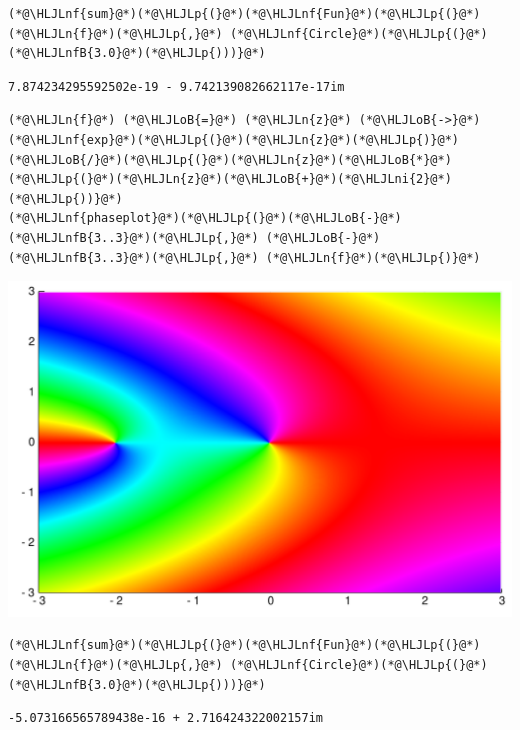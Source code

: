 \documentclass[12pt,a4paper]{article}
\newcommand{\HLJLn}[1]{#1}
\newcommand{\HLJLnf}[1]{\textcolor[RGB]{66,102,213}{#1}}
\newcommand{\HLJLnfB}[1]{\textcolor[RGB]{59,151,46}{#1}}
\newcommand{\HLJLni}[1]{\textcolor[RGB]{59,151,46}{#1}}
\newcommand{\HLJLoB}[1]{\textcolor[RGB]{102,102,102}{\textbf{#1}}}
\newcommand{\HLJLp}[1]{#1}
\begin{document}
\begin{lstlisting}
(*@\HLJLnf{sum}@*)(*@\HLJLp{(}@*)(*@\HLJLnf{Fun}@*)(*@\HLJLp{(}@*)(*@\HLJLn{f}@*)(*@\HLJLp{,}@*) (*@\HLJLnf{Circle}@*)(*@\HLJLp{(}@*)(*@\HLJLnfB{3.0}@*)(*@\HLJLp{)))}@*)
\end{lstlisting}

\begin{lstlisting}
7.874234295592502e-19 - 9.742139082662117e-17im
\end{lstlisting}


\begin{lstlisting}
(*@\HLJLn{f}@*) (*@\HLJLoB{=}@*) (*@\HLJLn{z}@*) (*@\HLJLoB{->}@*) (*@\HLJLnf{exp}@*)(*@\HLJLp{(}@*)(*@\HLJLn{z}@*)(*@\HLJLp{)}@*)(*@\HLJLoB{/}@*)(*@\HLJLp{(}@*)(*@\HLJLn{z}@*)(*@\HLJLoB{*}@*)(*@\HLJLp{(}@*)(*@\HLJLn{z}@*)(*@\HLJLoB{+}@*)(*@\HLJLni{2}@*)(*@\HLJLp{))}@*)
(*@\HLJLnf{phaseplot}@*)(*@\HLJLp{(}@*)(*@\HLJLoB{-}@*)(*@\HLJLnfB{3..3}@*)(*@\HLJLp{,}@*) (*@\HLJLoB{-}@*)(*@\HLJLnfB{3..3}@*)(*@\HLJLp{,}@*) (*@\HLJLn{f}@*)(*@\HLJLp{)}@*)
\end{lstlisting}

\includegraphics[width=\linewidth]{figures/Lecture3_11_1.pdf}

\begin{lstlisting}
(*@\HLJLnf{sum}@*)(*@\HLJLp{(}@*)(*@\HLJLnf{Fun}@*)(*@\HLJLp{(}@*)(*@\HLJLn{f}@*)(*@\HLJLp{,}@*) (*@\HLJLnf{Circle}@*)(*@\HLJLp{(}@*)(*@\HLJLnfB{3.0}@*)(*@\HLJLp{)))}@*)
\end{lstlisting}

\begin{lstlisting}
-5.073166565789438e-16 + 2.716424322002157im
\end{lstlisting}
\end{document}
